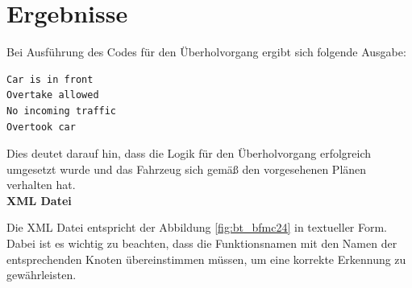 \newpage
\section{Ergebnisse}

Bei Ausführung des Codes für den Überholvorgang ergibt sich folgende Ausgabe:

\begin{lstlisting}[language=bash, caption={Ausgabe - Überholvorgang}]
Car is in front
Overtake allowed
No incoming traffic
Overtook car
\end{lstlisting}

Dies deutet darauf hin, dass die Logik für den Überholvorgang erfolgreich umgesetzt wurde und das Fahrzeug sich gemäß den vorgesehenen Plänen verhalten hat.\\

\textbf{XML Datei}

Die XML Datei entspricht der Abbildung \ref{fig:bt_bfmc24} in textueller Form. Dabei ist es wichtig zu beachten, dass die Funktionsnamen mit den Namen der entsprechenden Knoten übereinstimmen müssen, um eine korrekte Erkennung zu gewährleisten.

